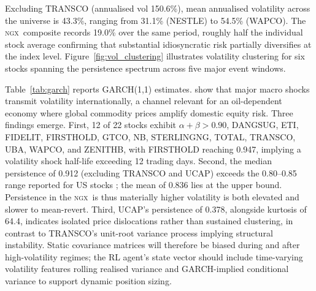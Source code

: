 \documentclass[twoside,11pt]{article}
\newcommand{\ngx}{\textsc{ngx}}
\begin{document}
	Excluding TRANSCO (annualised vol 150.6\%), mean annualised volatility across the universe is 43.3\%, ranging from 31.1\% (NESTLE) to 54.5\% (WAPCO). The \ngx\ composite records 19.0\% over the same period, roughly half the individual stock average confirming that substantial idiosyncratic risk partially diversifies at the index level. Figure~\ref{fig:vol_clustering} illustrates volatility clustering for six stocks spanning the persistence spectrum across five major event windows.
	
	Table~\ref{tab:garch} reports GARCH(1,1) estimates. \citet{engle2023covol} show that major macro shocks transmit volatility internationally, a channel relevant for an oil-dependent economy where global commodity prices amplify domestic equity risk. Three findings emerge. First, 12 of 22 stocks exhibit $\alpha + \beta > 0.90$, DANGSUG, ETI, FIDELIT, FIRSTHOLD, GTCO, NB, STERLINGNG, TOTAL, TRANSCO, UBA, WAPCO, and ZENITHB, with FIRSTHOLD reaching 0.947, implying a volatility shock half-life exceeding 12 trading days. Second, the median persistence of 0.912 (excluding TRANSCO and UCAP) exceeds the 0.80--0.85 range reported for US stocks \citep{aawaar2023african, bollerslev2023garch}; the mean of 0.836 lies at the upper bound. Persistence in the \ngx\ is thus materially higher volatility is both elevated and slower to mean-revert. Third, UCAP’s persistence of 0.378, alongside kurtosis of 64.4, indicates isolated price dislocations rather than sustained clustering, in contrast to TRANSCO’s unit-root variance process implying structural instability. Static covariance matrices will therefore be biased during and after high-volatility regimes; the RL agent’s state vector should include time-varying volatility features rolling realised variance and GARCH-implied conditional variance to support dynamic position sizing.
	
\end{document}
